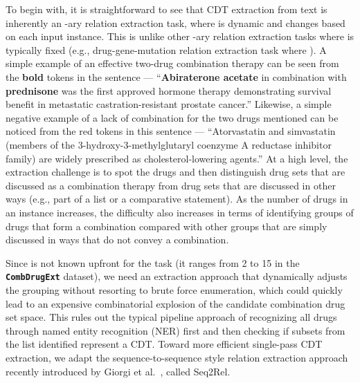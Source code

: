\documentclass[conference]{IEEEtran}
\begin{document}
To begin with, it is straightforward to see that CDT extraction  from text is inherently an -ary relation extraction task, where  is dynamic and changes based on each input instance. This is unlike other -ary relation extraction tasks where  is typically fixed (e.g., drug-gene-mutation relation extraction task where ). 
A simple example of an effective two-drug combination therapy can be seen from the \textbf{bold} tokens in the sentence --- ``\textbf{Abiraterone acetate} in combination with \textbf{prednisone} was the first approved hormone therapy demonstrating survival benefit in metastatic castration-resistant prostate cancer.'' Likewise, a simple negative example of a lack of combination for the two drugs mentioned can be noticed from the {\color{red}red} tokens in this sentence  --- ``{\color{red}Atorvastatin} and {\color{red}simvastatin} (members of the 3-hydroxy-3-methylglutaryl coenzyme A reductase inhibitor family) are widely prescribed as cholesterol-lowering agents.'' At a high level, the extraction challenge is to spot the drugs and then distinguish drug sets that are discussed as a combination therapy from drug sets that are discussed in other ways (e.g., part of a list or a comparative statement). As the number of drugs in an instance increases, the difficulty also increases in terms of identifying groups of drugs that form a combination compared with other groups that are simply discussed in   ways that do not convey a combination.

Since  is not known upfront for the task (it ranges from 2 to 15 in the \textbf{\texttt{CombDrugExt}} dataset), we need an extraction approach that dynamically adjusts the grouping without resorting to brute force enumeration, which could quickly lead to an expensive combinatorial explosion of the candidate combination drug set space. This rules out the typical pipeline approach of recognizing all drugs through named entity recognition (NER) first and then checking if subsets from the list identified represent a CDT. 
Toward more efficient single-pass CDT extraction,  we adapt the sequence-to-sequence style relation extraction approach recently introduced by Giorgi et al.~\cite{giorgi-etal-2022-sequence}, called Seq2Rel. 
\end{document}
